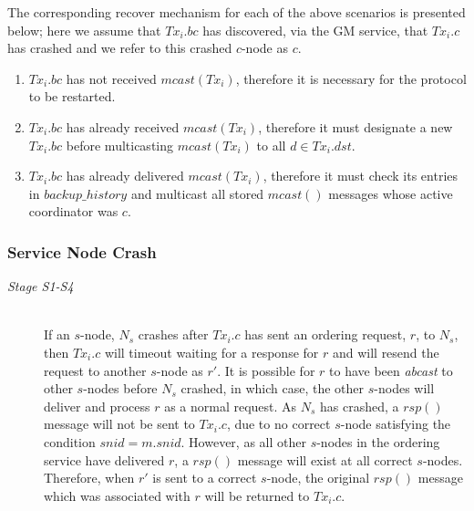 \begin{description}
                The corresponding recover mechanism for each of the above scenarios is presented below; here we assume that $Tx_i.bc$ has discovered, via the GM service, that $Tx_i.c$ has crashed and we refer to this crashed $c$-node as $c$.  
                \begin{enumerate}[label=\roman*]
                    \item    $Tx_i.bc$ has not received $mcast(Tx_i)$, therefore it is necessary for the protocol to be restarted.  
                    
                    \item    $Tx_i.bc$ has already received $mcast(Tx_i)$, therefore it must designate a new $Tx_i.bc$ before multicasting $mcast(Tx_i)$ to all $d \in Tx_i.dst$.  
                    
                    \item    $Tx_i.bc$ has already delivered $mcast(Tx_i)$, therefore it must check its entries in $backup\_history$ and multicast all stored $mcast()$ messages whose active coordinator was $c$.    
                \end{enumerate} 
    \end{description}
    
	\subsubsection*{Service Node Crash}
	\begin{description}
       \item[\emph{Stage S1-S4}] \hfill \\
       If an $s$-node, $N_s$ crashes after $Tx_i.c$ has sent an ordering request, $r$, to $N_s$, then $Tx_i.c$ will timeout waiting for a response for $r$ and will resend the request to another $s$-node as $r'$.    It is possible for $r$ to have been \emph{abcast} to other $s$-nodes before $N_s$ crashed, in which case, the other $s$-nodes will deliver and process $r$ as a normal request.  As $N_s$ has crashed, a $rsp()$ message will not be sent to $Tx_i.c$, due to no correct $s$-node satisfying the condition $snid = m.snid$.  However, as all other $s$-nodes in the ordering service have delivered $r$, a $rsp()$ message will exist at all correct $s$-nodes.  Therefore, when $r'$ is sent to a correct $s$-node, the original $rsp()$ message which was associated with $r$ will be returned to $Tx_i.c$.  
    \end{description}
    
